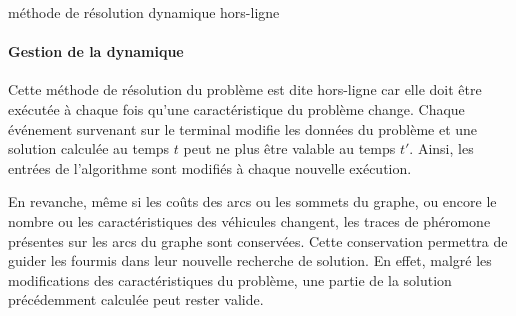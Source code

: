 \begin{algorithm}
\caption{méthode de résolution dynamique hors-ligne}
\label{algo:acoIteratif}
\end{algorithm}

\paragraph{Gestion de la dynamique}

Cette méthode de résolution du problème est dite hors-ligne car elle doit être exécutée à chaque fois qu'une caractéristique du problème change. Chaque événement survenant sur le terminal modifie les données du problème et une solution calculée au temps $t$ peut ne plus être valable au temps $t'$. Ainsi, les entrées de l'algorithme sont modifiés à chaque nouvelle exécution.

En revanche, même si les coûts des arcs ou les sommets du graphe, ou encore le nombre ou les caractéristiques des véhicules changent, les traces de phéromone présentes sur les arcs du graphe sont conservées. Cette conservation permettra de guider les fourmis dans leur nouvelle recherche de solution. En effet, malgré les modifications des caractéristiques du problème, une partie de la solution précédemment calculée peut rester valide.

